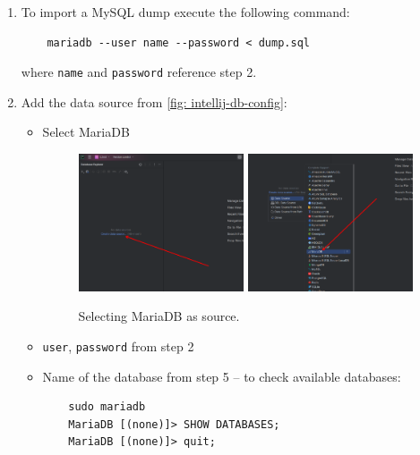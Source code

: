 \begin{enumerate}
  \item To import a MySQL dump execute the following command:
    \begin{verbatim}
    mariadb --user name --password < dump.sql
    \end{verbatim}
    where \texttt{name} and \texttt{password} reference step 2.

    \newpage

  \item Add the data source from \autoref{fig: intellij-db-config}:
    \begin{itemize}
      \item Select MariaDB
        \begin{figure}[H]
          \centering
          \includegraphics[width=0.49\textwidth]{img/datagrip/datagrip_2.png}
          \includegraphics[width=0.49\textwidth]{img/datagrip/datagrip_3.png}
          \caption{Selecting MariaDB as source.}
        \end{figure}
      \item \texttt{user}, \texttt{password} from step 2
      \item Name of the database from step 5 -- to check available databases:
    \begin{verbatim}
    sudo mariadb
    MariaDB [(none)]> SHOW DATABASES;
    MariaDB [(none)]> quit;
    \end{verbatim}
    \end{itemize}
    \begin{figure}[H]

\end{figure}
\end{enumerate}
